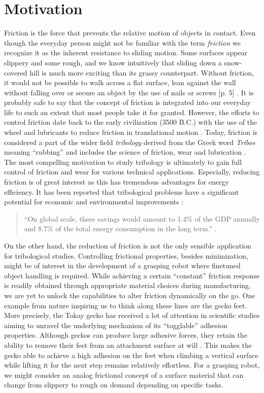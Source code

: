 \section{Motivation}
Friction is the force that prevents the relative motion of objects in contact. Even though the everyday person might not be familiar with the
term \textit{friction} we recognize it as the inherent resistance to sliding
motion. Some surfaces appear slippery and some rough, and we know intuitively
that sliding down a snow-covered hill is much more exciting than its grassy
counterpart. Without friction, it would not be possible to walk across a flat
surface, lean against the wall without falling over or secure an object by the
use of nails or screws [p. 5] \cite{gnecco_meyer_2015}. It is probably safe to
say that the concept of friction is integrated into our everyday life to such an
extent that most people take it for granted. However, the efforts to control
friction date back to the early civilization (3500 B.C.) with the use of the
wheel and lubricants to reduce friction in translational motion
\cite{bhushan_2013}. Today, friction is considered a part of the wider field
\textit{tribology} derived from the Greek word \textit{Tribos} meaning
``rubbing'' and includes the science of friction, wear and lubrication
\cite{bhushan_2013}. The most compelling motivation to study tribology is
ultimately to gain full control of friction and wear for various technical
applications. Especially, reducing friction is of great interest as this has
tremendous advantages for energy efficiency. It has been reported that
tribological problems have a significant potential for economic and
environmental improvements \cite{kim_nano-scale_2009}:
\begin{quote}
    ``On global scale, these savings would amount to 1.4\% of the GDP annually
    and 8.7\% of the total energy consumption in the long term.''
    \cite{holmberg_influence_2017}. 
\end{quote}
On the other hand, the reduction of friction is not the only sensible
application for tribological studies. Controlling frictional properties, besides
minimization, might be of interest in the development of a grasping robot where
finetuned object handling is required. While achieving a certain ``constant''
friction response is readily obtained through appropriate material choices during
manufacturing, we are yet to unlock the capabilities to alter friction
dynamically on the go. One example from nature inspiring us to think along
these lines are the gecko feet. More precisely, the Tokay gecko has received a
lot of attention in scientific studies aiming to unravel the underlying
mechanism of its ``togglable'' adhesion properties. Although geckos can
produce large adhesive forces, they retain the ability to remove their feet from
an attachment surface at will \cite{Gekko}. This makes the gecko able to achieve
a high adhesion on the feet when climbing a vertical surface while lifting it
for the next step remains relatively effortless. For a grasping robot, we might
consider an analog frictional concept of a surface material that can change from
slippery to rough on demand depending on specific tasks.


